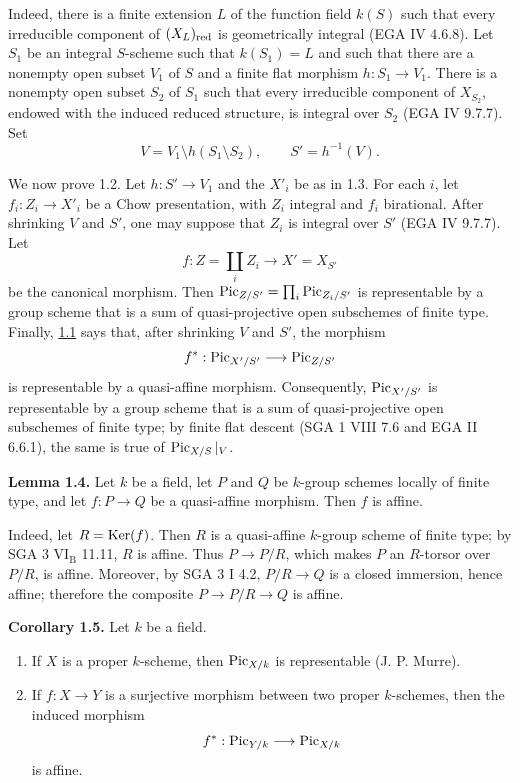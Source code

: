 Indeed, there is a finite extension $L$ of the function field $k(S)$ such
that every irreducible component of $(X_L)_{\mathrm{red}}$ is geometrically integral
(EGA IV 4.6.8). Let $S_1$ be an integral $S$-scheme such that $k(S_1)=L$ and
such that there are a nonempty open subset $V_1$ of $S$ and a finite flat
morphism $h:S_1\to V_1$. There is a nonempty open subset $S_2$ of $S_1$ such
that every irreducible component of $X_{S_2}$, endowed with the induced
reduced structure, is integral over $S_2$ (EGA IV 9.7.7). Set
\[
  V=V_1\setminus h(S_1\setminus S_2),\qquad S'=h^{-1}(V).
\]

We now prove 1.2. Let $h:S'\to V_1$ and the $X'_i$ be as in 1.3. For each
$i$, let $f_i:Z_i\to X'_i$ be a Chow presentation, with $Z_i$ integral and
$f_i$ birational. After shrinking $V$ and $S'$, one may suppose that $Z_i$
is integral over $S'$ (EGA IV 9.7.7). Let
\[
  f:Z=\coprod_i Z_i\longrightarrow X'=X_{S'}
\]
be the canonical morphism. Then
$\operatorname{Pic}_{Z/S'}=\prod_i\operatorname{Pic}_{Z_i/S'}$ is representable by a group scheme that is
a sum of quasi-projective open subschemes of finite type. Finally, \hyperlink{sga6.e12.thm.1-1}{1.1} says
that, after shrinking $V$ and $S'$, the morphism
\[
  f^*:\operatorname{Pic}_{X'/S'}\longrightarrow\operatorname{Pic}_{Z/S'}
\]
is representable by a quasi-affine morphism. Consequently,
$\operatorname{Pic}_{X'/S'}$ is representable by a group scheme that is a sum of
quasi-projective open subschemes of finite type; by finite flat descent
(SGA 1 VIII 7.6 and EGA II 6.6.1), the same is true of
$\operatorname{Pic}_{X/S}|_V$.

\textbf{Lemma 1.4.} Let $k$ be a field, let $P$ and $Q$ be $k$-group schemes
locally of finite type, and let $f:P\to Q$ be a quasi-affine morphism. Then
$f$ is affine.

Indeed, let $R=\operatorname{Ker}(f)$. Then $R$ is a quasi-affine $k$-group scheme of
finite type; by SGA 3 $\mathrm{VI}_{\mathrm B}$ 11.11, $R$ is affine.
Thus $P\to P/R$, which makes $P$ an $R$-torsor over $P/R$, is affine.
Moreover, by SGA 3 I 4.2, $P/R\to Q$ is a closed immersion, hence affine;
therefore the composite $P\to P/R\to Q$ is affine.

\textbf{Corollary 1.5.} Let $k$ be a field.
\begin{enumerate}[label=\alph*)]
\item If $X$ is a proper $k$-scheme, then $\operatorname{Pic}_{X/k}$ is representable
  (J. P. Murre).
\item If $f:X\to Y$ is a surjective morphism between two proper $k$-schemes,
  then the induced morphism
  \[
    f^*:\operatorname{Pic}_{Y/k}\longrightarrow\operatorname{Pic}_{X/k}
  \]
  is affine.
\end{enumerate}

